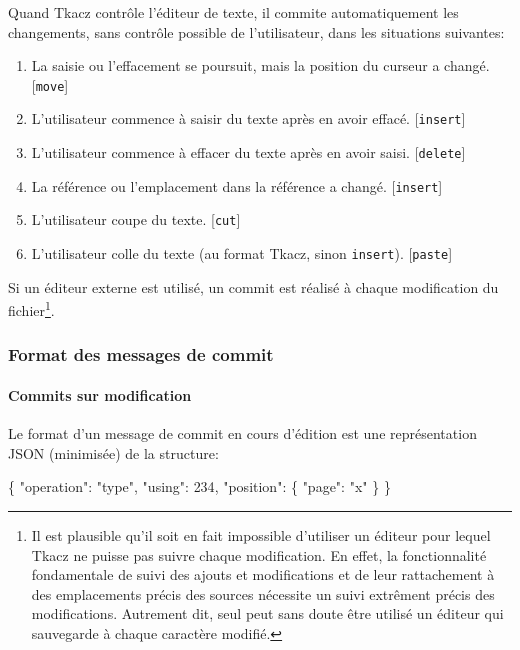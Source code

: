 \documentclass[11pt]{article}
\newenvironment{Shaded}{}{}
\newcommand{\DataTypeTok}[1]{\textcolor[rgb]{0.56,0.13,0.00}{{#1}}}
\newcommand{\DecValTok}[1]{\textcolor[rgb]{0.25,0.63,0.44}{{#1}}}
\newcommand{\StringTok}[1]{\textcolor[rgb]{0.25,0.44,0.63}{{#1}}}
\newcommand{\NormalTok}[1]{{#1}}
\begin{document}
Quand Tkacz contrôle l'éditeur de texte, il commite automatiquement les
changements, sans contrôle possible de l'utilisateur, dans les
situations suivantes:

\begin{enumerate}
\def\labelenumi{\arabic{enumi}.}
\item
  La saisie ou l'effacement se poursuit, mais la position du curseur a
  changé. {[}\texttt{move}{]}
\item
  L'utilisateur commence à saisir du texte après en avoir effacé.
  {[}\texttt{insert}{]}
\item
  L'utilisateur commence à effacer du texte après en avoir saisi.
  {[}\texttt{delete}{]}
\item
  La référence ou l'emplacement dans la référence a changé.
  {[}\texttt{insert}{]}
\item
  L'utilisateur coupe du texte. {[}\texttt{cut}{]}
\item
  L'utilisateur colle du texte (au format Tkacz, sinon \texttt{insert}).
  {[}\texttt{paste}{]}
\end{enumerate}

Si un éditeur externe est utilisé, un commit est réalisé à chaque
modification du fichier\footnote{Il est plausible qu'il soit en fait
  impossible d'utiliser un éditeur pour lequel Tkacz ne puisse pas
  suivre chaque modification. En effet, la fonctionnalité fondamentale
  de suivi des ajouts et modifications et de leur rattachement à des
  emplacements précis des sources nécessite un suivi extrêment précis
  des modifications. Autrement dit, seul peut sans doute être utilisé un
  éditeur qui sauvegarde à chaque caractère modifié.}.

\subsubsection{Format des messages de
commit}\label{format-des-messages-de-commit}

\paragraph{Commits sur modification}\label{commits-sur-modification}

Le format d'un message de commit en cours d'édition est une
représentation JSON (minimisée) de la structure:

\begin{Shaded}
\begin{Highlighting}[]
\NormalTok{\{}
    \DataTypeTok{"operation"}\NormalTok{: }\StringTok{"type"}\NormalTok{,}
    \DataTypeTok{"using"}\NormalTok{:     }\DecValTok{234}\NormalTok{,}
    \DataTypeTok{"position"}\NormalTok{: \{}
        \DataTypeTok{"page"}\NormalTok{: }\StringTok{"x"}
    \NormalTok{\}}
\NormalTok{\}}
\end{Highlighting}
\end{Shaded}
\end{document}
